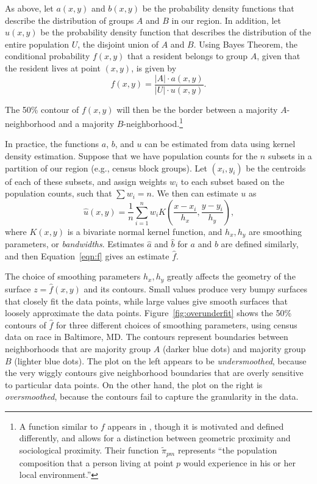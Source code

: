 \documentclass{article}
\theoremstyle{theorem}
\theoremstyle{definition}
\begin{document}
As above, let $a(x,y)$ and $b(x,y)$ be the probability density functions that describe the distribution of groups $A$ and $B$ in our region. In addition, let $u(x,y)$ be the probability density function that describes the distribution of the entire population $U$, the disjoint union of $A$ and $B$. Using Bayes Theorem, the conditional probability $f(x,y)$ that a resident belongs to group $A$, given that the resident lives at point $(x,y)$, is given by
\begin{equation}\label{eqn:f}
  f(x,y) = \frac{\lvert A\rvert\cdot a(x,y)}{\lvert U\rvert \cdot u(x,y)}\text{.}
\end{equation}

The 50\% contour of $f(x,y)$ will then be the border between a majority $A$-neighborhood and a majority $B$-neighborhood.\footnote{A function similar to $f$ appears in \cite{reardonosullivan04}, though it is motivated and defined differently, and allows for a distinction between geometric proximity and sociological proximity. Their function $\tilde{\pi}_{pm}$ represents ``the population composition that a person living at point $p$ would experience in his or her local environment.''}

In practice, the functions $a$, $b$, and $u$ can be estimated from data using kernel density estimation. Suppose that we have population counts for the $n$ subsets in a partition of our region (e.g., census block groups). Let $(x_i, y_i)$ be the centroids of each of these subsets, and assign weights $w_i$ to each subset based on the population counts, such that $\sum w_i = n$. We then can estimate $u$ as
$$
\hat{u}(x,y) = \frac{1}{n} \sum_{i=1}^n w_i K\left(\frac{x-x_i}{h_x}, \frac{y-y_i}{h_y} \right)\text{,}
$$
where $K(x,y)$ is a bivariate normal kernel function, and $h_x, h_y$ are smoothing parameters, or \textit{bandwidths}. Estimates $\hat{a}$ and $\hat{b}$ for $a$ and $b$ are defined similarly, and then Equation~\ref{eqn:f} gives an estimate $\hat{f}$.

The choice of smoothing parameters $h_x, h_y$ greatly affects the geometry of the surface $z = \hat{f}(x,y)$ and its contours. Small values produce very bumpy surfaces that closely fit the data points, while large values give smooth surfaces that loosely approximate the data points. Figure~\ref{fig:overunderfit} shows the 50\% contours of $\hat{f}$ for three different choices of smoothing parameters, using census data on race in Baltimore, MD. The contours represent boundaries between neighborhoods that are majority group $A$ (darker blue dots) and majority group $B$ (lighter blue dots). The plot on the left appears to be \textit{undersmoothed}, because the very wiggly contours give neighborhood boundaries that are overly sensitive to particular data points. On the other hand, the plot on the right is \textit{oversmoothed}, because the contours fail to capture the granularity in the data.
\end{document}
